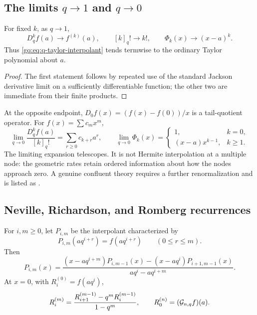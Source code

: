 \subsection{The limits \texorpdfstring{$q\to1$}{q to 1} and \texorpdfstring{$q\to0$}{q to 0}}

\begin{proposition}
\label{g2:prop:taylor-limit}
For fixed $k$, as $q\to1$,
\[
 D_q^kf(a)\longrightarrow f^{(k)}(a),
 \qquad [k]_q!\longrightarrow k!,
 \qquad \Phi_k(x)\longrightarrow(x-a)^k.
\]
Thus \eqref{gq:eq:q-taylor-interpolant} tends termwise to the ordinary Taylor
polynomial about $a$.
\end{proposition}

\begin{proof}
The first statement follows by repeated use of the standard Jackson derivative
limit on a sufficiently differentiable function; the other two are immediate
from their finite products.
\end{proof}

At the opposite endpoint, $D_0f(x)=(f(x)-f(0))/x$ is a tail-quotient operator.
For $f(x)=\sum c_mx^m$,
\[
 \lim_{q\to0}\frac{D_q^kf(a)}{[k]_q!}
 =\sum_{r\ge0}c_{k+r}a^r,
 \qquad
 \lim_{q\to0}\Phi_k(x)=
 \begin{cases}
 1,&k=0,\\
 (x-a)x^{k-1},&k\ge1.
 \end{cases}
\]
The limiting expansion telescopes.  It is not Hermite interpolation at a
multiple node: the geometric rates retain ordered information about how the
nodes approach zero.  A genuine confluent theory requires a further
renormalization and is listed as .

\subsection{Neville, Richardson, and Romberg recurrences}

\begin{theorem}
\label{g2:thm:neville}
For $i,m\ge0$, let $P_{i,m}$ be the interpolant characterized by
\[
 P_{i,m}(aq^{i+r})=f(aq^{i+r})\qquad(0\le r\le m).
\]
Then
\begin{equation}
 P_{i,m}(x)=
 \frac{(x-aq^{i+m})P_{i,m-1}(x)
      -(x-aq^i)P_{i+1,m-1}(x)}
      {aq^i-aq^{i+m}}.
 \label{g2:eq:geometric-neville}
\end{equation}
At $x=0$, with $R_i^{(0)}=f(aq^i)$,
\begin{equation}
 R_i^{(m)}
 =\frac{R_{i+1}^{(m-1)}-q^mR_i^{(m-1)}}{1-q^m},
 \qquad
 R_0^{(n)}=(\mathcal G_{n,q}f)(a).
 \label{g2:eq:richardson-recurrence}
\end{equation}
\end{theorem}

